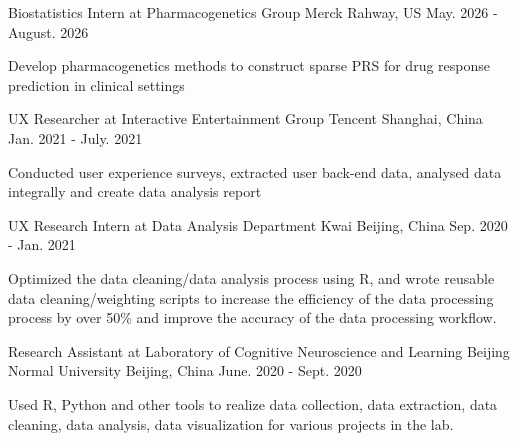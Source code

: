 
\begin{cventries}
  \cventry
    {Biostatistics Intern at Pharmacogenetics Group} %
    {Merck} %
    {Rahway, US} %
    {May. 2026 - August. 2026} %
    {
      \begin{cvitems} %
        \item {Develop pharmacogenetics methods to construct sparse PRS for drug response prediction in clinical settings}
      \end{cvitems}
    }

  \cventry
    {UX Researcher at Interactive Entertainment Group} %
    {Tencent} %
    {Shanghai, China} %
    {Jan. 2021 - July. 2021} %
    {
      \begin{cvitems} %
        \item {Conducted user experience surveys, extracted user back-end data, analysed data integrally and create data analysis report  }
      \end{cvitems}
    }
    
  \cventry
    {UX Research Intern at Data Analysis Department} %
    {Kwai} %
    {Beijing, China} %
    {Sep. 2020 - Jan. 2021} %
    {
      \begin{cvitems} %
        \item {Optimized the data cleaning/data analysis process using R, and wrote reusable data cleaning/weighting scripts to increase the efficiency of the data processing process by over 50\% and improve the accuracy of the data processing workflow.}
      \end{cvitems}
    }
  \cventry
    {Research Assistant at Laboratory of Cognitive Neuroscience and Learning} %
    {Beijing Normal University} %
    {Beijing, China} %
    {June. 2020 - Sept. 2020} %
    {
      \begin{cvitems} %
        \item {Used R, Python and other tools to realize data collection, data extraction, data cleaning, data analysis, data visualization for various projects in the lab.}
      \end{cvitems}
    }
    

\end{cventries}
